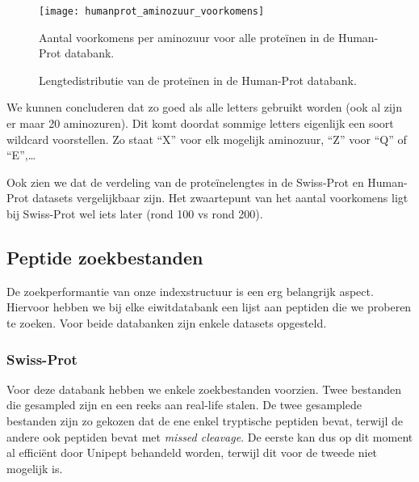 \begin{figure}[H]
    \centering
    \texttt{[image: humanprot\_aminozuur\_voorkomens]}
    \caption{Aantal voorkomens per aminozuur voor alle proteïnen in de Human-Prot databank.}
    \label{fig:humanprot_aminozuur}
\end{figure}

\begin{figure}[H]
    \centering
    \hfill
    \caption{Lengtedistributie van de proteïnen in de Human-Prot databank.}\label{fig:humanprot_length}
\end{figure}

We kunnen concluderen dat zo goed als alle letters gebruikt worden (ook al zijn er maar 20 aminozuren).
Dit komt doordat sommige letters eigenlijk een soort wildcard voorstellen.
Zo staat ``X'' voor elk mogelijk aminozuur, ``Z'' voor ``Q'' of ``E'',\ldots

Ook zien we dat de verdeling van de proteïnelengtes in de Swiss-Prot en Human-Prot datasets vergelijkbaar zijn.
Het zwaartepunt van het aantal voorkomens ligt bij Swiss-Prot wel iets later (rond 100 vs rond 200).

\subsection{Peptide zoekbestanden}\label{subsec:peptide-zoek-bestanden}
De zoekperformantie van onze indexstructuur is een erg belangrijk aspect.
Hiervoor hebben we bij elke eiwitdatabank een lijst aan peptiden die we proberen te zoeken.
Voor beide databanken zijn enkele datasets opgesteld.

\subsubsection{Swiss-Prot}
Voor deze databank hebben we enkele zoekbestanden voorzien.
Twee bestanden die gesampled zijn en een reeks aan real-life stalen.
De twee gesamplede bestanden zijn zo gekozen dat de ene enkel tryptische peptiden bevat, terwijl de andere ook peptiden bevat met \textit{missed cleavage}.
De eerste kan dus op dit moment al efficiënt door Unipept behandeld worden, terwijl dit voor de tweede niet mogelijk is.

